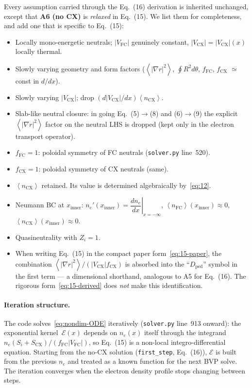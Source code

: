 \documentclass[11pt]{article}
\renewcommand{\ne}{n_{e}}  %
\newcommand{\nfc}{n_{\mathrm{FC}}}
\newcommand{\ncx}{n_{\mathrm{CX}}}
\newcommand{\Vfc}{\lvert V_{\mathrm{FC}}\rvert}
\newcommand{\Vcx}{\lvert V_{\mathrm{CX}}\rvert}
\newcommand{\Si}{S_{i}}
\newcommand{\Scx}{S_{\mathrm{CX}}}
\newcommand{\Dped}{D_{\mathrm{ped}}}
\newcommand{\fFC}{f_{\mathrm{FC}}}
\newcommand{\fCX}{f_{\mathrm{CX}}}
\newcommand{\fsa}[1]{\left\langle #1 \right\rangle}
\newcommand{\gradrsq}{\fsa{|\nabla r|^{2}}}
\newcommand{\neginf}{x=-\infty}
\newcommand{\dneneg}{\left.\dfrac{d\ne}{dx}\right|_{\neginf}}
\newcommand{\xin}{x_{\mathrm{inner}}}
\begin{document}
Every assumption carried through the Eq.~(16) derivation is inherited
unchanged, except that \textbf{A6 (no CX)} is \emph{relaxed} in Eq.~(15).
We list them for completeness, and add one that is specific to Eq.~(15):

\begin{itemize}
  \item[\textbf{A1}] Locally mono-energetic neutrals; $\Vfc$ genuinely
        constant, $\Vcx=\Vcx(x)$ locally thermal.
  \item[\textbf{A2}] Slowly varying geometry and form factors ($\gradrsq$,
        $\oint R^{2}d\theta$, $\fFC$, $\fCX$ $\simeq$ const in $d/dx$).
  \item[\textbf{A2b}] Slowly varying $\Vcx$; drop $(d\Vcx/dx)\fsa{\ncx}$.
  \item[\textbf{A3}] Slab-like neutral closure: in going
        Eq.~(5)$\to$(8) and (6)$\to$(9) the explicit $\gradrsq$ factor on
        the neutral LHS is dropped (kept only in the electron transport
        operator).
  \item[\textbf{A4}] $\fFC=1$: poloidal symmetry of FC neutrals
        (\texttt{solver.py} line~520).
  \item[\textbf{A4b}] $\fCX=1$: poloidal symmetry of CX neutrals (same).
  \item[\textbf{A6 (relaxed)}] $\fsa{\ncx}$ retained.  Its value is
        determined algebraically by~\eqref{eq:12}.
  \item[\textbf{A7}] Neumann BC at $\xin$: $\ne'(\xin)=\dneneg$,
        $\fsa{\nfc}(\xin)\approx 0$, $\fsa{\ncx}(\xin)\approx 0$.
  \item[\textbf{A8}] Quasineutrality with $Z_{i}=1$.
  \item[\textbf{A9 (new)}] When writing Eq.~(15) in the compact paper
        form~\eqref{eq:15-paper}, the combination $\gradrsq/(\Vcx\fCX)$
        is absorbed into the ``$\Dped$'' symbol in the first term ---
        a dimensional shorthand, analogous to A5 for Eq.~(16).  The
        rigorous form~\eqref{eq:15-derived} does \emph{not} make this
        identification.
\end{itemize}

\paragraph{Iteration structure.}  The code solves~\eqref{eq:nondim-ODE}
iteratively (\texttt{solver.py} line~913 onward): the exponential
kernel~$\mathcal{E}(x)$ depends on $\ne(x)$ itself through the integrand
$\ne(\Si+\Scx)/(\fFC\Vfc)$, so Eq.~(15) is a non-local integro-differential
equation.  Starting from the no-CX solution (\texttt{first\_step},
Eq.~(16)), $\mathcal{E}$ is built from the previous $\ne$ and treated as
a known function for the next BVP solve.  The iteration converges when
the electron density profile stops changing between steps.
\end{document}
